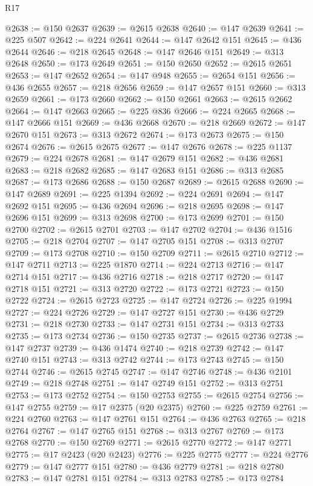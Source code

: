 \begin{lexlean}{R17}
\begin{coremodule}
@2638 := @150 @2637
@2639 := @2615 @2638
@2640 := @147 @2639
@2641 := @225 @507
@2642 := @224 @2641
@2644 := @147 @2642 @151
@2645 := @436 @2644
@2646 := @218 @2645
@2648 := @147 @2646 @151
@2649 := @313 @2648
@2650 := @173 @2649
@2651 := @150 @2650
@2652 := @2615 @2651
@2653 := @147 @2652
@2654 := @147 @948
@2655 := @2654 @151
@2656 := @436 @2655
@2657 := @218 @2656
@2659 := @147 @2657 @151
@2660 := @313 @2659
@2661 := @173 @2660
@2662 := @150 @2661
@2663 := @2615 @2662
@2664 := @147 @2663
@2665 := @225 @836
@2666 := @224 @2665
@2668 := @147 @2666 @151
@2669 := @436 @2668
@2670 := @218 @2669
@2672 := @147 @2670 @151
@2673 := @313 @2672
@2674 := @173 @2673
@2675 := @150 @2674
@2676 := @2615 @2675
@2677 := @147 @2676
@2678 := @225 @1137
@2679 := @224 @2678
@2681 := @147 @2679 @151
@2682 := @436 @2681
@2683 := @218 @2682
@2685 := @147 @2683 @151
@2686 := @313 @2685
@2687 := @173 @2686
@2688 := @150 @2687
@2689 := @2615 @2688
@2690 := @147 @2689
@2691 := @225 @1394
@2692 := @224 @2691
@2694 := @147 @2692 @151
@2695 := @436 @2694
@2696 := @218 @2695
@2698 := @147 @2696 @151
@2699 := @313 @2698
@2700 := @173 @2699
@2701 := @150 @2700
@2702 := @2615 @2701
@2703 := @147 @2702
@2704 := @436 @1516
@2705 := @218 @2704
@2707 := @147 @2705 @151
@2708 := @313 @2707
@2709 := @173 @2708
@2710 := @150 @2709
@2711 := @2615 @2710
@2712 := @147 @2711
@2713 := @225 @1870
@2714 := @224 @2713
@2716 := @147 @2714 @151
@2717 := @436 @2716
@2718 := @218 @2717
@2720 := @147 @2718 @151
@2721 := @313 @2720
@2722 := @173 @2721
@2723 := @150 @2722
@2724 := @2615 @2723
@2725 := @147 @2724
@2726 := @225 @1994
@2727 := @224 @2726
@2729 := @147 @2727 @151
@2730 := @436 @2729
@2731 := @218 @2730
@2733 := @147 @2731 @151
@2734 := @313 @2733
@2735 := @173 @2734
@2736 := @150 @2735
@2737 := @2615 @2736
@2738 := @147 @2737
@2739 := @436 @1474
@2740 := @218 @2739
@2742 := @147 @2740 @151
@2743 := @313 @2742
@2744 := @173 @2743
@2745 := @150 @2744
@2746 := @2615 @2745
@2747 := @147 @2746
@2748 := @436 @2101
@2749 := @218 @2748
@2751 := @147 @2749 @151
@2752 := @313 @2751
@2753 := @173 @2752
@2754 := @150 @2753
@2755 := @2615 @2754
@2756 := @147 @2755
@2759 := @17 @2375 (@20 @2375)
@2760 := @225 @2759
@2761 := @224 @2760
@2763 := @147 @2761 @151
@2764 := @436 @2763
@2765 := @218 @2764
@2767 := @147 @2765 @151
@2768 := @313 @2767
@2769 := @173 @2768
@2770 := @150 @2769
@2771 := @2615 @2770
@2772 := @147 @2771
@2775 := @17 @2423 (@20 @2423)
@2776 := @225 @2775
@2777 := @224 @2776
@2779 := @147 @2777 @151
@2780 := @436 @2779
@2781 := @218 @2780
@2783 := @147 @2781 @151
@2784 := @313 @2783
@2785 := @173 @2784

\end{coremodule}
\end{lexlean}
